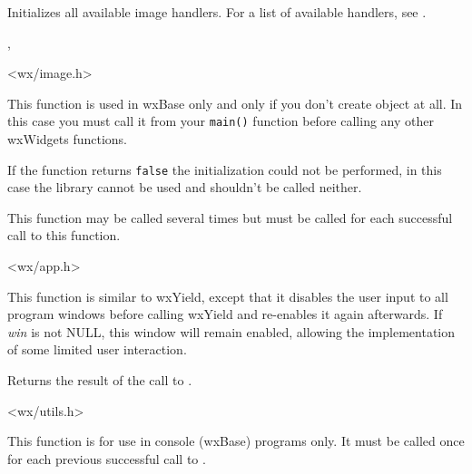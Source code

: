 Initializes all available image handlers. For a list of available handlers,
see .


, 


<wx/image.h>


\label{wxinitialize}


This function is used in wxBase only and only if you don't create
 object at all. In this case you must call it from your
{\tt main()} function before calling any other wxWidgets functions.

If the function returns {\tt false} the initialization could not be performed,
in this case the library cannot be used and
 shouldn't be called neither.

This function may be called several times but
 must be called for each successful
call to this function.


<wx/app.h>


\label{wxsafeyield}


This function is similar to wxYield, except that it disables the user input to
all program windows before calling wxYield and re-enables it again
afterwards. If {\it win} is not NULL, this window will remain enabled,
allowing the implementation of some limited user interaction.

Returns the result of the call to .


<wx/utils.h>


\label{wxuninitialize}


This function is for use in console (wxBase) programs only. It must be called
once for each previous successful call to .


